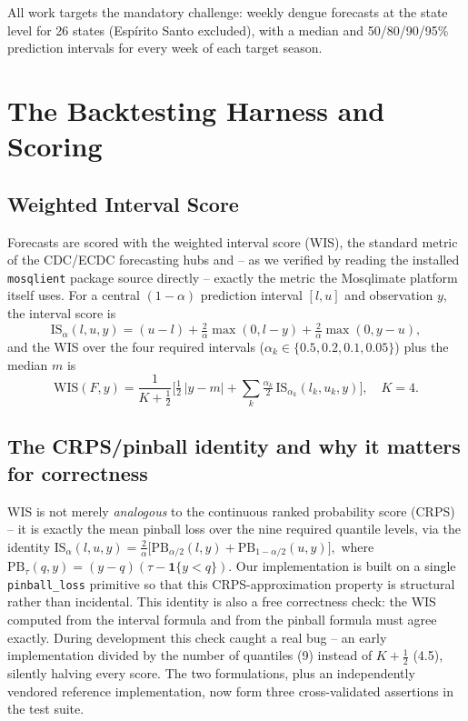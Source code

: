 \documentclass[11pt]{report}
\begin{document}
All work targets the mandatory challenge: weekly dengue forecasts at the state level for 26 states (Esp\'irito Santo excluded), with a median and 50/80/90/95\% prediction intervals for every week of each target season.

\chapter{The Backtesting Harness and Scoring}

\section{Weighted Interval Score}
Forecasts are scored with the weighted interval score (WIS), the standard metric of the CDC/ECDC forecasting hubs and -- as we verified by reading the installed \texttt{mosqlient} package source directly -- exactly the metric the Mosqlimate platform itself uses. For a central $(1-\alpha)$ prediction interval $[l,u]$ and observation $y$, the interval score is
\[
\mathrm{IS}_\alpha(l,u,y) = (u-l) + \tfrac{2}{\alpha}\max(0,l-y) + \tfrac{2}{\alpha}\max(0,y-u),
\]
and the WIS over the four required intervals ($\alpha_k \in \{0.5,0.2,0.1,0.05\}$) plus the median $m$ is
\[
\mathrm{WIS}(F,y) = \frac{1}{K+\tfrac12}\Big[\tfrac12\,|y-m| + \textstyle\sum_k \tfrac{\alpha_k}{2}\,\mathrm{IS}_{\alpha_k}(l_k,u_k,y)\Big], \quad K=4.
\]

\section{The CRPS/pinball identity and why it matters for correctness}
WIS is not merely \emph{analogous} to the continuous ranked probability score (CRPS) -- it is exactly the mean pinball loss over the nine required quantile levels, via the identity
\(
\mathrm{IS}_\alpha(l,u,y) = \tfrac{2}{\alpha}\big[\mathrm{PB}_{\alpha/2}(l,y) + \mathrm{PB}_{1-\alpha/2}(u,y)\big],
\)
where $\mathrm{PB}_\tau(q,y)=(y-q)(\tau-\mathbf 1\{y<q\})$. Our implementation is built on a single \texttt{pinball\_loss} primitive so that this CRPS-approximation property is structural rather than incidental. This identity is also a free correctness check: the WIS computed from the interval formula and from the pinball formula must agree exactly. During development this check caught a real bug -- an early implementation divided by the number of quantiles (9) instead of $K+\tfrac12$ (4.5), silently halving every score. The two formulations, plus an independently vendored reference implementation, now form three cross-validated assertions in the test suite.
\end{document}
